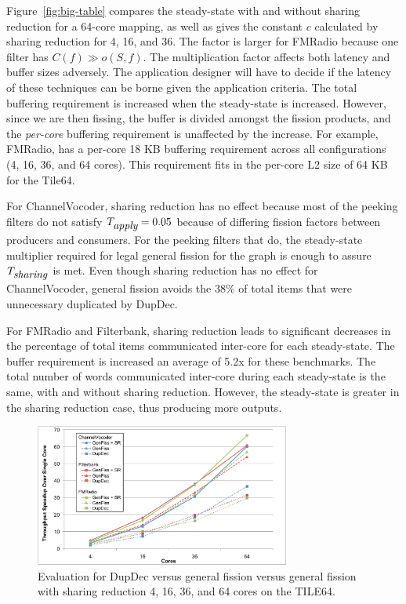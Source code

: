 Figure~\ref{fig:big-table} compares the steady-state with and
without sharing reduction for a 64-core mapping, as well as gives the
constant $c$ calculated by sharing reduction for 4, 16, and 36.  The
factor is larger for FMRadio because one filter has $C(f) \gg o(S,
f)$.  The multiplication factor affects both latency and buffer sizes
adversely.  The application designer will have to decide if the
latency of these techniques can be borne given the application
criteria.  The total buffering requirement is increased when the
steady-state is increased.  However, since we are then fissing, the
buffer is divided amongst the fission products, and the {\it per-core}
buffering requirement is unaffected by the increase.  For example,
FMRadio, has a per-core 18 KB buffering requirement across all
configurations (4, 16, 36, and 64 cores).  This requirement fits in
the per-core L2 size of 64 KB for the Tile64.

 For ChannelVocoder,
sharing reduction has no effect because most of the peeking filters do
not satisfy $T_{\mbox{\it apply}} = 0.05$ because of differing fission
factors between producers and consumers.  For the peeking filters that do,
the steady-state multiplier required for legal general fission for the
graph is enough to assure $T_{\mbox{\it sharing}}$ is met.  Even though
sharing reduction has no effect for ChannelVocoder, general fission
avoids the 38\% of total items that were unnecessary duplicated by
DupDec.

For FMRadio and Filterbank, sharing reduction leads to significant
decreases in the percentage of total items communicated inter-core for
each steady-state.  The buffer requirement is increased an average of
5.2x for these benchmarks.  The total number of words communicated
inter-core during each steady-state is the same, with and without
sharing reduction.  However, the steady-state is greater in the
sharing reduction case, thus producing more outputs.

\begin{figure}[t]
\centering
\includegraphics[width=3.3in]{figures/tilera-chart.pdf}
\caption[Comparing the fission techniques on the TILE64.]{
  Evaluation for DupDec versus general fission versus general fission with sharing reduction
  4, 16, 36, and 64 cores on the TILE64.  \label{fig:tilera-chart}}
\end{figure}

